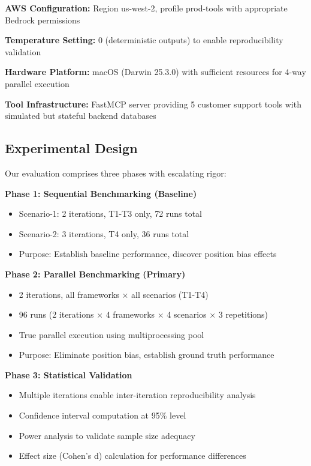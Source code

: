\documentclass[sigconf,nonacm]{acmart}
\begin{document}
\textbf{AWS Configuration:} Region us-west-2, profile prod-tools with appropriate Bedrock permissions

\textbf{Temperature Setting:} 0 (deterministic outputs) to enable reproducibility validation

\textbf{Hardware Platform:} macOS (Darwin 25.3.0) with sufficient resources for 4-way parallel execution

\textbf{Tool Infrastructure:} FastMCP server providing 5 customer support tools with simulated but stateful backend databases

\subsection{Experimental Design}

Our evaluation comprises three phases with escalating rigor:

\textbf{Phase 1: Sequential Benchmarking (Baseline)}
\begin{itemize}
\item Scenario-1: 2 iterations, T1-T3 only, 72 runs total
\item Scenario-2: 3 iterations, T4 only, 36 runs total
\item Purpose: Establish baseline performance, discover position bias effects
\end{itemize}

\textbf{Phase 2: Parallel Benchmarking (Primary)}
\begin{itemize}
\item 2 iterations, all frameworks × all scenarios (T1-T4)
\item 96 runs (2 iterations × 4 frameworks × 4 scenarios × 3 repetitions)
\item True parallel execution using multiprocessing pool
\item Purpose: Eliminate position bias, establish ground truth performance
\end{itemize}

\textbf{Phase 3: Statistical Validation}
\begin{itemize}
\item Multiple iterations enable inter-iteration reproducibility analysis
\item Confidence interval computation at 95\% level
\item Power analysis to validate sample size adequacy
\item Effect size (Cohen's d) calculation for performance differences
\end{itemize}
\end{document}
